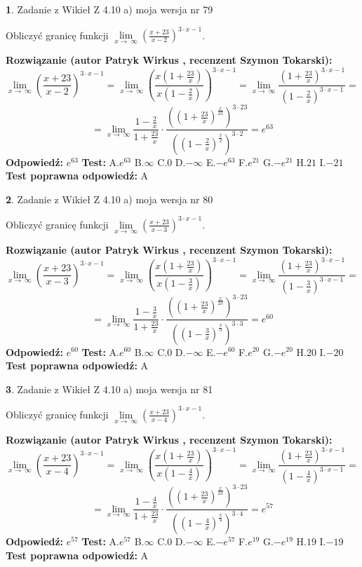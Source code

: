 \documentclass[12pt, a4paper]{article}
\theoremstyle{definition} %
\newtheorem{zad}{}
\newcommand{\zadStart}[1]{\begin{zad}#1\newline}
\newcommand{\zadStop}{\end{zad}}
\newcommand{\rozwStart}[2]{\noindent \textbf{Rozwiązanie (autor #1 , recenzent #2): }\newline}
\newcommand{\rozwStop}{\newline}
\newcommand{\odpStart}{\noindent \textbf{Odpowiedź:}\newline}
\newcommand{\odpStop}{\newline}
\newcommand{\testStart}{\noindent \textbf{Test:}\newline}
\newcommand{\testStop}{\newline}
\newcommand{\kluczStart}{\noindent \textbf{Test poprawna odpowiedź:}\newline}
\newcommand{\kluczStop}{\newline}
\begin{document}
\zadStart{Zadanie z Wikieł Z 4.10 a) moja wersja nr 79}

Obliczyć granicę funkcji  $\lim\limits_{x\to\ \infty}(\frac{x+23}{x-2})^{3\cdot x-1}$.
\zadStop
\rozwStart{Patryk Wirkus}{Szymon Tokarski}
$$\lim\limits_{x\to\ \infty}(\frac{x+23}{x-2})^{3\cdot x-1} = \lim\limits_{x\to\ \infty}(\frac{x(1+\frac{23}{x})}{x(1-\frac{2}{x})})^{3\cdot x-1}=\lim\limits_{x\to\ \infty}\frac{(1+\frac{23}{x})^{3\cdot x-1}}{(1-\frac{2}{x})^{3\cdot x-1}}=$$
$$=\lim\limits_{x\to\ \infty}\frac{1-\frac{2}{x}}{1+\frac{23}{x}}\cdot\frac{((1+\frac{23}{x})^{\frac{x}{23}})^{3\cdot23}}{((1-\frac{2}{x})^{\frac{x}{2}})^{3\cdot2}}=e^{63}$$
\rozwStop
\odpStart
$e^{63}$
\odpStop
\testStart
A.$e^{63}$ B.$\infty$ C.$0$ D.$-\infty$ E.$-e^{63}$
F.$e^{21}$ G.$-e^{21}$
H.$21$
I.$-21$
\testStop
\kluczStart
A
\kluczStop



\zadStart{Zadanie z Wikieł Z 4.10 a) moja wersja nr 80}

Obliczyć granicę funkcji  $\lim\limits_{x\to\ \infty}(\frac{x+23}{x-3})^{3\cdot x-1}$.
\zadStop
\rozwStart{Patryk Wirkus}{Szymon Tokarski}
$$\lim\limits_{x\to\ \infty}(\frac{x+23}{x-3})^{3\cdot x-1} = \lim\limits_{x\to\ \infty}(\frac{x(1+\frac{23}{x})}{x(1-\frac{3}{x})})^{3\cdot x-1}=\lim\limits_{x\to\ \infty}\frac{(1+\frac{23}{x})^{3\cdot x-1}}{(1-\frac{3}{x})^{3\cdot x-1}}=$$
$$=\lim\limits_{x\to\ \infty}\frac{1-\frac{3}{x}}{1+\frac{23}{x}}\cdot\frac{((1+\frac{23}{x})^{\frac{x}{23}})^{3\cdot23}}{((1-\frac{3}{x})^{\frac{x}{3}})^{3\cdot3}}=e^{60}$$
\rozwStop
\odpStart
$e^{60}$
\odpStop
\testStart
A.$e^{60}$ B.$\infty$ C.$0$ D.$-\infty$ E.$-e^{60}$
F.$e^{20}$ G.$-e^{20}$
H.$20$
I.$-20$
\testStop
\kluczStart
A
\kluczStop



\zadStart{Zadanie z Wikieł Z 4.10 a) moja wersja nr 81}

Obliczyć granicę funkcji  $\lim\limits_{x\to\ \infty}(\frac{x+23}{x-4})^{3\cdot x-1}$.
\zadStop
\rozwStart{Patryk Wirkus}{Szymon Tokarski}
$$\lim\limits_{x\to\ \infty}(\frac{x+23}{x-4})^{3\cdot x-1} = \lim\limits_{x\to\ \infty}(\frac{x(1+\frac{23}{x})}{x(1-\frac{4}{x})})^{3\cdot x-1}=\lim\limits_{x\to\ \infty}\frac{(1+\frac{23}{x})^{3\cdot x-1}}{(1-\frac{4}{x})^{3\cdot x-1}}=$$
$$=\lim\limits_{x\to\ \infty}\frac{1-\frac{4}{x}}{1+\frac{23}{x}}\cdot\frac{((1+\frac{23}{x})^{\frac{x}{23}})^{3\cdot23}}{((1-\frac{4}{x})^{\frac{x}{4}})^{3\cdot4}}=e^{57}$$
\rozwStop
\odpStart
$e^{57}$
\odpStop
\testStart
A.$e^{57}$ B.$\infty$ C.$0$ D.$-\infty$ E.$-e^{57}$
F.$e^{19}$ G.$-e^{19}$
H.$19$
I.$-19$
\testStop
\kluczStart
A
\kluczStop
\end{document}
